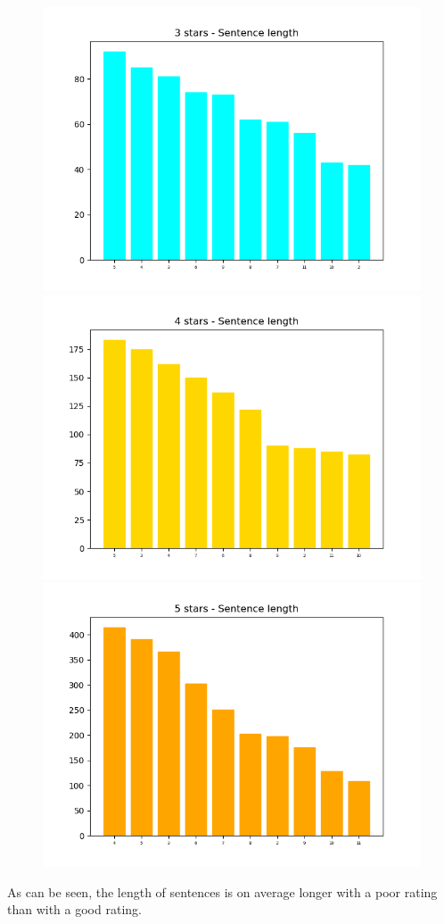\begin{figure}
		\includegraphics[scale=0.3]{figures/3stars-Sentencelength.png}
		\includegraphics[scale=0.3]{figures/4stars-Sentencelength.png}
		\includegraphics[scale=0.3]{figures/5stars-Sentencelength.png}
	\end{figure}
	As can be seen, the length of sentences is on average longer with a poor rating than with a good rating. 
	